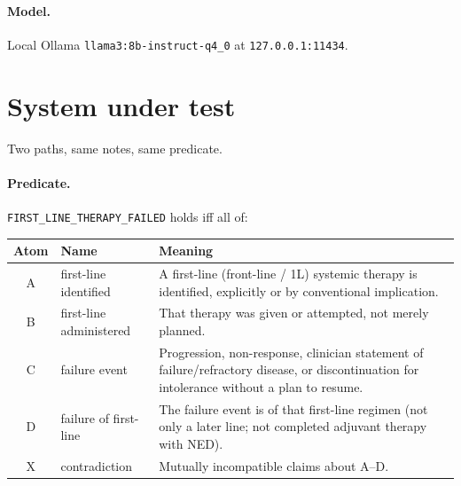 \documentclass[11pt,a4paper]{article}
\newcommand{\pred}{\texttt{FIRST\_LINE\_THERAPY\_FAILED}}
\newcommand{\sat}{\textsc{Satisfied}}
\newcommand{\nsat}{\textsc{NotSatisfied}}
\newcommand{\unc}{\textsc{Uncertain}}
\newcommand{\con}{\textsc{Contradiction}}
\begin{document}
\paragraph{Model.}
Local Ollama \texttt{llama3:8b-instruct-q4\_0} at \texttt{127.0.0.1:11434}.

\section{System under test}

Two paths, same notes, same predicate.

\vspace{0.6em}
\begin{center}
\end{center}

\paragraph{Predicate.} \pred{} holds iff all of:

\begin{center}
\begin{tabular}{@{}c l L{10.6cm}@{}}
\toprule
Atom & Name & Meaning \\
\midrule
A & first-line identified & A first-line (front-line / 1L) systemic therapy is identified, explicitly or by conventional implication. \\
B & first-line administered & That therapy was given or attempted, not merely planned. \\
C & failure event & Progression, non-response, clinician statement of failure/refractory disease, or discontinuation for intolerance without a plan to resume. \\
D & failure of first-line & The failure event is of that first-line regimen (not only a later line; not completed adjuvant therapy with NED). \\
X & contradiction & Mutually incompatible claims about A--D. \\
\bottomrule
\end{tabular}
\end{center}
\end{document}
